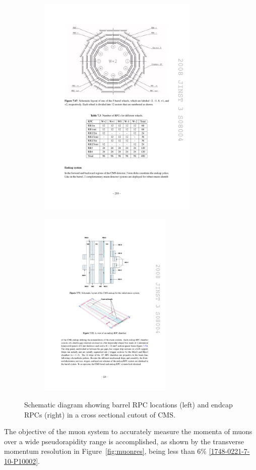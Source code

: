 \begin{figure}[tbh]
\centering
\begin{subfigure}{0.45\textwidth}
\centering
\includegraphics[width=3in]{figures/rpcbarrel.pdf}
\caption{}
\end{subfigure}
\begin{subfigure}{0.45\textwidth}
\centering
\includegraphics[width=2.5in]{figures/rpcendcap.pdf}
\caption{}
\end{subfigure}
\caption{Schematic diagram showing barrel RPC locations (left) and endcap RPCs (right) in a cross sectional cutout of CMS.}
\label{fig:rpcs}
\end{figure}

\indent The objective of the muon system to accurately measure the momenta of muons over a wide pseudorapidity range is accomplished, as shown by the transverse momentum resolution in Figure~\ref{fig:muonres}, being less than 6\% \ref{1748-0221-7-10-P10002}.

